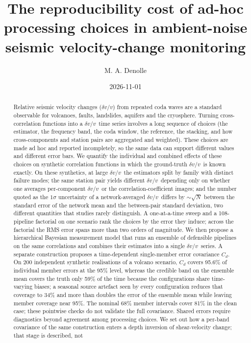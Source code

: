 \documentclass[
  referee]{gji}
\title{The reproducibility cost of ad-hoc processing choices in
ambient-noise seismic velocity-change monitoring}
\author{M. A. Denolle}
\date{2026-11-01}
\providecommand{\dvv}{\ensuremath{\delta v/v}}
\begin{document}
\maketitle
\begin{abstract}
Relative seismic velocity changes (\dvv) from repeated coda waves are a
standard observable for volcanoes, faults, landslides, aquifers and the
cryosphere. Turning cross-correlation functions into a \dvv~time series
involves a long sequence of choices (the estimator, the frequency band,
the coda window, the reference, the stacking, and how cross-components
and station pairs are aggregated and weighted). These choices are made
ad hoc and reported incompletely, so the same data can support different
values and different error bars. We quantify the individual and combined
effects of these choices on synthetic correlation functions in which the
ground-truth \dvv~is known exactly. On these synthetics, at large
\dvv~the estimators split by family with distinct failure modes; the
same station pair yields different \dvv~depending only on whether one
averages per-component \dvv~or the correlation-coefficient images; and
the number quoted as the \(1\sigma\) uncertainty of a network-averaged
\dvv~differs by \(\sim\!\sqrt{N}\) between the standard error of the
network mean and the between-pair standard deviation, two different
quantities that studies rarely distinguish. A one-at-a-time sweep and a
108-pipeline factorial on one scenario rank the choices by the error
they induce; across the factorial the RMS error spans more than two
orders of magnitude. We then propose a hierarchical Bayesian measurement
model that runs an ensemble of defensible pipelines on the same
correlations and combines their estimates into a single \dvv~series. A
separate construction proposes a time-dependent single-member error
covariance \(C_d\). On 200 independent synthetic realisations of a
volcano scenario, \(C_d\) covers 95.6\% of individual member errors at
the 95\% level, whereas the credible band on the ensemble mean covers
the truth only 59\% of the time because the configurations share
time-varying biases; a seasonal source artefact seen by every
configuration reduces that coverage to 34\% and more than doubles the
error of the ensemble mean while leaving member coverage near 95\%. The
nominal 68\% member intervals cover 81\% in the clean case; these
pointwise checks do not validate the full covariance. Shared errors
require diagnostics beyond agreement among processing choices. We set
out how a per-band covariance of the same construction enters a depth
inversion of shear-velocity change; that stage is described, not

\end{abstract}
\end{document}
